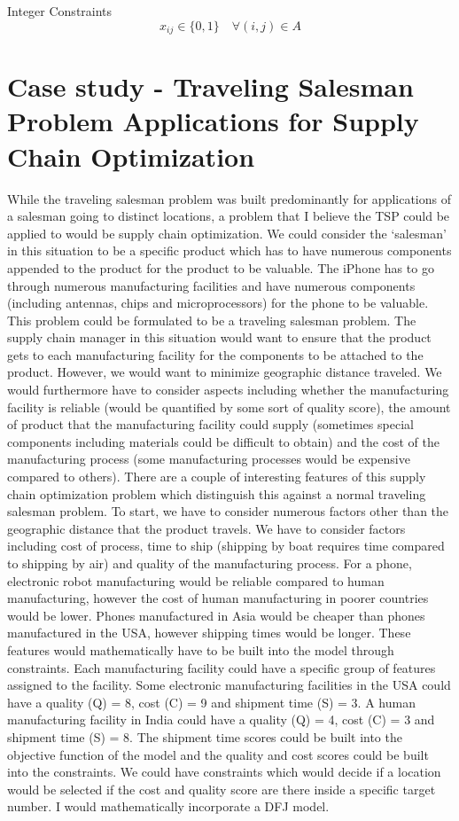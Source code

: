 Integer Constraints
\begin{equation}
x_{ij} \in \{0,1\} \quad \forall (i,j) \in A
\end{equation}

\section{Case study - Traveling Salesman Problem Applications for Supply Chain Optimization}

While the traveling salesman problem was built predominantly for applications of a salesman going to distinct locations, a problem that I believe the TSP could be applied to would be supply chain optimization. We could consider the ‘salesman’ in this situation to be a specific product which has to have numerous components appended to the product for the product to be valuable. The iPhone has to go through numerous manufacturing facilities and have numerous components (including antennas, chips and microprocessors) for the phone to be valuable. This problem could be formulated to be a traveling salesman problem. The supply chain manager in this situation would want to ensure that the product gets to each manufacturing facility for the components to be attached to the product. However, we would want to minimize geographic distance traveled. We would furthermore have to consider aspects including whether the manufacturing facility is reliable (would be quantified by some sort of quality score), the amount of product that the manufacturing facility could supply (sometimes special components including materials could be difficult to obtain) and the cost of the manufacturing process (some manufacturing processes would be expensive compared to others). 
There are a couple of interesting features of this supply chain optimization problem which distinguish this against a normal traveling salesman problem. To start, we have to consider numerous factors other than the geographic distance that the product travels. We have to consider factors including cost of process, time to ship (shipping by boat requires time compared to shipping by air) and quality of the manufacturing process. For a phone, electronic robot manufacturing would be reliable compared to human manufacturing, however the cost of human manufacturing in poorer countries would be lower. Phones manufactured in Asia would be cheaper than phones manufactured in the USA, however shipping times would be longer. These features would mathematically have to be built into the model through constraints. Each manufacturing facility could have a specific group of features assigned to the facility. Some electronic manufacturing facilities in the USA could have a quality (Q) = 8, cost (C) = 9 and shipment time (S) = 3. A human manufacturing facility in India could have a quality (Q) = 4, cost (C) = 3 and shipment time (S) = 8. The shipment time scores could be built into the objective function of the model and the quality and cost scores could be built into the constraints. We could have constraints which would decide if a location would be selected if the cost and quality score are there inside a specific target number. I would mathematically incorporate a DFJ model. 
